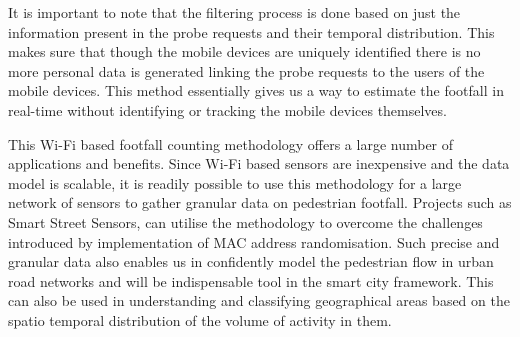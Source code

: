\documentclass[11t, a4paper, twocolumn]{article}
\begin{document}
	It is important to note that the filtering process is done based on just
	the information present in the probe requests
	and their temporal distribution.
	This makes sure that though the mobile devices are uniquely identified
	there is no more personal data is generated linking the probe requests
	to the users of the mobile devices. This method essentially gives us a
	way to estimate the footfall in real-time without identifying or tracking the
	mobile devices themselves.

	This Wi-Fi based footfall counting methodology offers a large number of
	applications and benefits. Since Wi-Fi based sensors are inexpensive and the
	data model is scalable, it is readily possible to use this methodology for
	a large network of sensors to gather granular data on pedestrian footfall.
	Projects such as Smart Street Sensors, can utilise the methodology to
	overcome the challenges introduced by implementation of MAC address
	randomisation. Such precise and granular data also enables us in confidently
	model the pedestrian flow in urban road networks and will be indispensable
	tool in the smart city framework. This can also be used in understanding and
	classifying geographical areas based on the spatio temporal distribution of
	the volume of activity in them.

	\printbibliography[title={References}]
\end{document}
